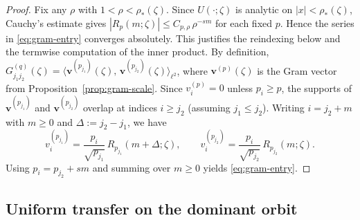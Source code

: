 \documentclass[11pt]{amsart}
\numberwithin{equation}{section}
\theoremstyle{plain}
\theoremstyle{definition}
\theoremstyle{remark}
\begin{document}
\begin{proof}
	Fix any $\rho$ with $1<\rho<\rho_*(\zeta)$. Since $U(\cdot;\zeta)$ is analytic on $|x|<\rho_*(\zeta)$,
	Cauchy's estimate gives $|R_p(m;\zeta)|\le C_{p,\rho}\,\rho^{-sm}$ for each fixed $p$.
	Hence the series in \eqref{eq:gram-entry} converges absolutely. This justifies
	the reindexing below and the termwise computation of the inner product.
	By definition,
	$G^{(q)}_{j_1j_2}(\zeta)
		=\bigl\langle
		\bm v^{(p_{j_1})}(\zeta),\,
		\bm v^{(p_{j_2})}(\zeta)
		\bigr\rangle_{\ell^2}$,
	where $\bm v^{(p)}(\zeta)$ is the Gram vector from
	Proposition~\ref{prop:gram-scale}.
	Since $v^{(p)}_i=0$ unless $p_i\ge p$, the supports of
	$\bm v^{(p_{j_1})}$ and $\bm v^{(p_{j_2})}$ overlap at indices
	$i\ge j_2$ (assuming $j_1\le j_2$).
	Writing $i=j_2+m$ with $m\ge0$ and $\Delta:=j_2-j_1$, we have
	\[
		v^{(p_{j_1})}_i
		=\frac{p_i}{\sqrt{p_{j_1}}}\,R_{p_{j_1}}(m+\Delta;\zeta),
		\qquad
		v^{(p_{j_2})}_i
		=\frac{p_i}{\sqrt{p_{j_2}}}\,R_{p_{j_2}}(m;\zeta).
	\]
	Using $p_i=p_{j_2}+sm$ and summing over $m\ge0$ yields
	\eqref{eq:gram-entry}.
\end{proof}


\subsection{Uniform transfer on the dominant orbit}\label{subsec:standing-transfer}
\end{document}
